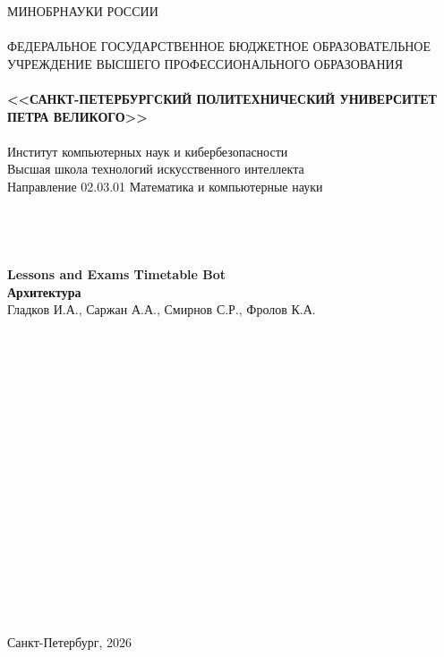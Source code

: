 \documentclass[10pt,a4paper,final]{article} %
\begin{document}
\thispagestyle{empty}

\begin{center}
	{\Large МИНОБРНАУКИ РОССИИ}\\
	~\\
	{\large ФЕДЕРАЛЬНОЕ ГОСУДАРСТВЕННОЕ БЮДЖЕТНОЕ ОБРАЗОВАТЕЛЬНОЕ УЧРЕЖДЕНИЕ ВЫСШЕГО ПРОФЕССИОНАЛЬНОГО ОБРАЗОВАНИЯ}\\
	~\\
	{\Large \bf <<САНКТ-ПЕТЕРБУРГСКИЙ ПОЛИТЕХНИЧЕСКИЙ УНИВЕРСИТЕТ ПЕТРА ВЕЛИКОГО>>}\\
	~\\
	{\large Институт компьютерных наук и кибербезопасности}\\
	{\large Высшая школа технологий искусственного интеллекта}\\
	{\large Направление 02.03.01 Математика и компьютерные науки}\\
	~\\
	~\\
	~\\
	~\\
	{\Large \bf Lessons and Exams Timetable Bot}\\
		{\Large \bf Архитектура}\\
	{\Large Гладков И.А., Саржан А.А., Смирнов С.Р., Фролов К.А.}\\
	~\\
	~\\


	~\\
	~\\
	~\\
	~\\
	~\\
	~\\
	~\\

	~\\
	~\\
	~\\

	~\\
	~\\
	~\\

	~\\
	~\\
	~\\




	{\large Санкт-Петербург, 2026}
\end{center}
\newpage

\tableofcontents
\end{document}
